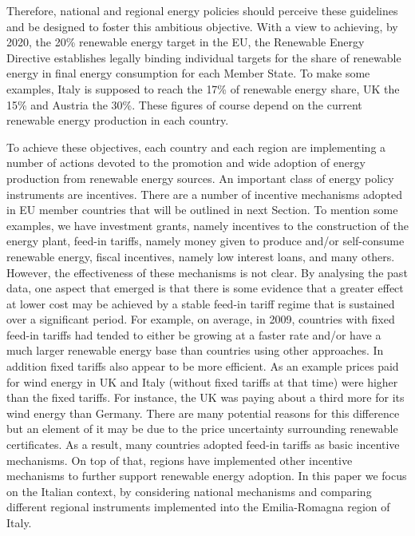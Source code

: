 \documentclass [twocolumn,a4paper,10pt]{ECMS}
\begin{document}
Therefore, national and regional energy policies should perceive these guidelines and be designed to foster this ambitious objective. With a view to achieving, by 2020, the 20\% renewable energy target in the EU, the Renewable Energy Directive establishes legally binding individual targets for the share of renewable energy in final energy
consumption for each Member State. To make some examples, Italy is supposed to reach the 17\% of renewable energy share, UK the 15\% and Austria the 30\%. These figures of course depend on the current renewable energy production in each country.

To achieve these objectives, each country and each region are implementing a number of actions devoted to the promotion and wide adoption of energy production from renewable energy sources. An important class of energy policy instruments are incentives. There are a number of incentive mechanisms adopted in EU member countries that will be outlined in next Section. %
To mention some examples, we have investment grants, namely incentives to the construction of the energy plant, feed-in tariffs, namely money given to produce and/or self-consume renewable energy, fiscal incentives, namely low interest loans, and many others. However, the effectiveness of these mechanisms is  not clear. By analysing the past data, one aspect that emerged is that there is some evidence that a greater effect at lower cost may be achieved by a stable feed-in tariff regime that is sustained over a significant period. For example, on average, in 2009, countries with fixed feed-in tariffs had tended to either be growing at a faster rate and/or have a much larger renewable energy base than countries using other approaches. In addition fixed tariffs also appear to be more efficient. As an example prices paid for wind energy in UK and Italy (without fixed tariffs at that time) were higher than the fixed tariffs. For instance, the UK was paying about a third more for its wind energy than Germany. There are many potential reasons for this difference but an element of it may be due to the price uncertainty surrounding renewable certificates. 
As a result, many countries adopted feed-in tariffs as basic incentive mechanisms. On top of that, regions have implemented other incentive mechanisms to further support renewable energy adoption. In this paper we focus on the Italian context, by considering national mechanisms and comparing different regional instruments implemented into the Emilia-Romagna region of Italy.
\end{document}
